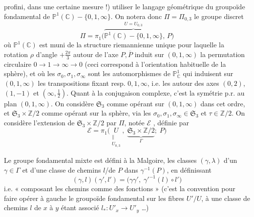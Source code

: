 \documentclass[11pt,a4paper]{article}
\begin{document}
profini, dans une certaine mesure !) utiliser le langage géométrique du
groupoïde fondamental de $\mathbb{P}^1(\mathbb{C}) - \{0, 1, \infty\}$.
 On notera donc $\Pi = \Pi_{0,3}$ le groupe discret
\[
\Pi = \pi_1\bigl(\overbrace{\mathbb{P}^1(\mathbb{C}) - \{0, 1, \infty\}}^{U = U_{0,3}},\, P\bigr)
\]
où $\mathbb{P}^1(\mathbb{C})$ est muni de la structure 
riemannienne  unique pour laquelle la rotation $\rho$ d'angle
$+\frac{2\pi}{3}$ autour de l'axe $P, \overline{P}$ \struck{\ill{}} induit sur
$(0, 1, \infty)$ la permutation circulaire $0 \to 1 \to \infty \to 0$ (ceci
correspond à l'orientation habituelle de la sphère), et où les
$\sigma_0, \sigma_1, \sigma_\infty$ \struck{\ill{}} sont les automorphismes
\ill{} de $\mathbb{P}^1_{\mathbb{C}}$ qui \struck{\ill{}} 
induisent sur $(0, 1, \infty)$ les transpositions fixant resp. $0, 1, \infty$,
i.e. les   autour des axes $(0, 2)$,
$(1, -1)$ et $(\infty, \frac{1}{2})$. Quant à la conjugaison complexe, c'est la
symétrie p.r. au plan $(0, 1, \infty)$. On considère $\mathfrak{S}_3$ comme
opérant sur $(0, 1, \infty)$ dans cet ordre, et
$\mathfrak{S}_3 \times \mathbb{Z}/2$ comme opérant sur la sphère, via les
$\sigma_0, \sigma_1, \sigma_\infty \in \mathfrak{S}_3$ et
$\tau \in \mathbb{Z}/2$. On considère l'extension \struck{\ill{}} de
$\mathfrak{S}_3 \times \mathbb{Z}/2$ par $\Pi$, notée $\mathcal{E}$
, définie par
\[
\mathcal{E} = \pi_1\bigl(\underset{\substack{\| \\ U_{0,3}}}{U},\;
\underbrace{\mathfrak{S}_3 \times \mathbb{Z}/2}_{\Gamma};\; P\bigr)
\]





Le groupe fondamental mixte est défini à la Malgoire, 
les classes $(\gamma, \lambda)$ d'un $\gamma \in \Gamma$ et d'une classe de chemins
$l$/de $P$ dans $\gamma^{-1}(P)$, en définissant
\[
(\gamma, l)(\gamma', l') = \bigl(\gamma\gamma',\; \gamma'^{-1}(l) \circ l'\bigr)
\]
i.e. « composant les chemins comme des fonctions » (c'est la convention pour
faire opérer à gauche le groupoïde fondamental sur les fibres
  $U'/U$, à une classe de chemins
$l$ de $x$ à $y$ étant associé $l_* : U'_x \to U'_y$ …)
\end{document}
